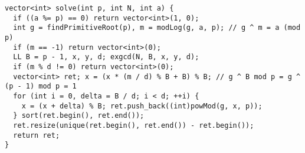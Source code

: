 \begin{lstlisting}
vector<int> solve(int p, int N, int a) {
  if ((a %= p) == 0) return vector<int>(1, 0);
  int g = findPrimitiveRoot(p), m = modLog(g, a, p); // g ^ m = a (mod p)
  if (m == -1) return vector<int>(0);
  LL B = p - 1, x, y, d; exgcd(N, B, x, y, d);
  if (m % d != 0) return vector<int>(0);
  vector<int> ret; x = (x * (m / d) % B + B) % B; // g ^ B mod p = g ^ (p - 1) mod p = 1
  for (int i = 0, delta = B / d; i < d; ++i) {
    x = (x + delta) % B; ret.push_back((int)powMod(g, x, p));
  } sort(ret.begin(), ret.end());
  ret.resize(unique(ret.begin(), ret.end()) - ret.begin());
  return ret;
}
\end{lstlisting}